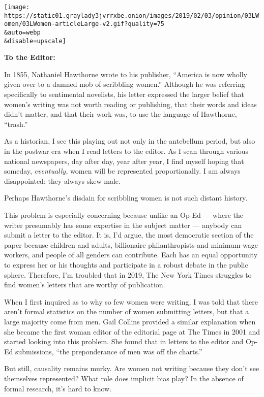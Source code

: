 \texttt{[image: https://static01.graylady3jvrrxbe.onion/images/2019/02/03/opinion/03LWomen/03LWomen-articleLarge-v2.gif?quality=75\\\&auto=webp\\\&disable=upscale]}

\textbf{To the Editor:}

In 1855, Nathaniel Hawthorne wrote to his publisher, ``America is now
wholly given over to a damned mob of scribbling women.'' Although he was
referring specifically to sentimental novelists, his letter expressed
the larger belief that women's writing was not worth reading or
publishing, that their words and ideas didn't matter, and that their
work was, to use the language of Hawthorne, ``trash.''

As a historian, I see this playing out not only in the antebellum
period, but also in the postwar era when I read letters to the editor.
As I scan through various national newspapers, day after day, year after
year, I find myself hoping that someday, \emph{eventually,} women will
be represented proportionally. I am always disappointed; they always
skew male.

Perhaps Hawthorne's disdain for scribbling women is not such distant
history.

This problem is especially concerning because unlike an Op-Ed --- where
the writer presumably has some expertise in the subject matter ---
anybody can submit a letter to the editor. It is, I'd argue, the most
democratic section of the paper because children and adults, billionaire
philanthropists and minimum-wage workers, and people of all genders can
contribute. Each has an equal opportunity to express her or his thoughts
and participate in a robust debate in the public sphere. Therefore, I'm
troubled that in 2019, The New York Times struggles to find women's
letters that are worthy of publication.

When I first inquired as to why so few women were writing, I was told
that there aren't formal statistics on the number of women submitting
letters, but that a large majority come from men. Gail Collins provided
a similar explanation when she became the first woman editor of the
editorial page at The Times in 2001 and started looking into this
problem. She found that in letters to the editor and Op-Ed submissions,
``the preponderance of men was off the charts.''

But still, causality remains murky. Are women not writing because they
don't see themselves represented? What role does implicit bias play? In
the absence of formal research, it's hard to know.

